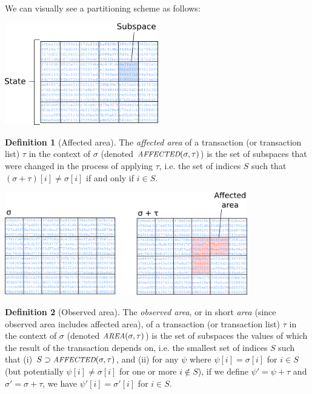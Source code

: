 \documentclass[11pt,a4paper]{article}
\makeatletter
\theoremstyle{plain}
\theoremstyle{definition}
\newtheorem{defn}{Definition}[section]
\theoremstyle{remark}
\newcommand{\ie}{i.e.\@\xspace}
\newcommand{\makeintoafunction}[1]{\textit{\uppercase{\small #1}}}
\newcommand{\AFFECTED}{\makeintoafunction{affected}}
\newcommand{\AREA}{\makeintoafunction{area}}
\makeatother
\begin{document}
We can visually see a partitioning scheme as follows:

\begin{center}
\includegraphics[width=190pt]{subspace2.png}
\end{center}

\begin{defn}[Affected area]
The \emph{affected area} of a transaction (or transaction list) $\tau$ in the context of $\sigma$ (denoted $\AFFECTED(\sigma, \tau)$) is the set of subspaces that were changed in the process of applying $\tau$, \ie the set of indices $S$ such that $(\sigma + \tau)[i] \ne \sigma[i]$ if and only if $i \in S$.
\end{defn}

\begin{center}
\includegraphics[width=300pt]{subspace1.png}
\end{center}

\begin{defn}[Observed area]
The \emph{observed area}, or in short \emph{area} (since observed area includes affected area), of a transaction (or transaction list) $\tau$ in the context of $\sigma$ (denoted $\AREA(\sigma, \tau)$) is the set of subspaces the values of which the result of the transaction depends on, \ie the smallest set of indices $S$ such that (i) $S \supset \AFFECTED(\sigma, \tau)$, and (ii) for any $\psi$ where $\psi[i] = \sigma[i]$ for $i \in S$ (but potentially $\psi[i] \ne \sigma[i]$ for one or more $i \notin S$), if we define $\psi' = \psi + \tau$ and $\sigma' = \sigma + \tau$, we have $\psi'[i] = \sigma'[i]$ for $i \in S$.
\end{defn}
\end{document}
